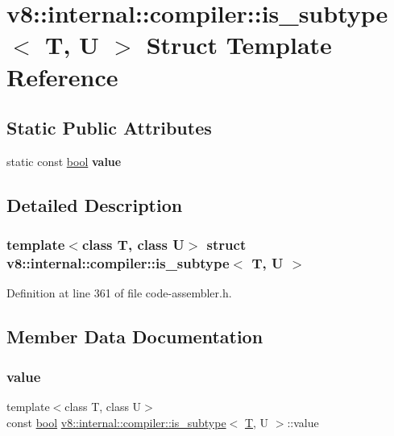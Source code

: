 \hypertarget{structv8_1_1internal_1_1compiler_1_1is__subtype}{}\section{v8\+:\+:internal\+:\+:compiler\+:\+:is\+\_\+subtype$<$ T, U $>$ Struct Template Reference}
\label{structv8_1_1internal_1_1compiler_1_1is__subtype}
\subsection*{Static Public Attributes}
\begin{DoxyCompactItemize}
\item 
static const \mbox{\hyperlink{classbool}{bool}} {\bfseries value}
\end{DoxyCompactItemize}


\subsection{Detailed Description}
\subsubsection*{template$<$class T, class U$>$\newline
struct v8\+::internal\+::compiler\+::is\+\_\+subtype$<$ T, U $>$}



Definition at line 361 of file code-\/assembler.\+h.



\subsection{Member Data Documentation}
\mbox{\label{structv8_1_1internal_1_1compiler_1_1is__subtype_aff8e11a5363d260541bde7ee33b2b48b}} 
\subsubsection{\texorpdfstring{value}{value}}
{\footnotesize\ttfamily template$<$class T, class U$>$ \\
const \mbox{\hyperlink{classbool}{bool}} \mbox{\hyperlink{structv8_1_1internal_1_1compiler_1_1is__subtype}{v8\+::internal\+::compiler\+::is\+\_\+subtype}}$<$ \mbox{\hyperlink{classv8_1_1internal_1_1torque_1_1T}{T}}, U $>$\+::value\hspace{0.3cm}{\ttfamily [static]}}

